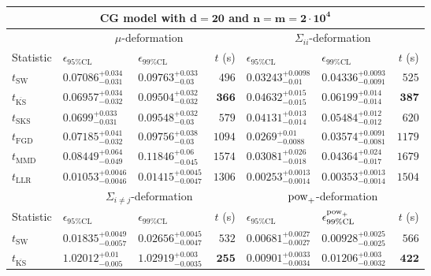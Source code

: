 \begin{tabular}{l|llr|llr}
	\toprule
	\multicolumn{7}{c}{{\bf CG model with $\mathbf{d=20}$ and $\mathbf{n=m=2\cdot 10^{4}}$}} \\
	\toprule
	\multicolumn{1}{c}{} & \multicolumn{3}{c}{$\mu$-deformation} & \multicolumn{3}{c}{$\Sigma_{ii}$-deformation} \\
	Statistic & $\epsilon_{95\%\mathrm{CL}}$ & $\epsilon_{99\%\mathrm    {CL}}$ & $t$ (s) & $\epsilon_{95\%\mathrm{CL}}$ & $\epsilon_{99\%\mathrm{CL}}$ & $t$ (s) \\
	\midrule
	$t_{\mathrm{SW}}$ & $0.07086_{-0.031}^{+0.034}$ & $0.09763_{-0.03}^{+0.033}$ & $496$ & $0.03243_{-0.01}^{+0.0098}$ & $0.04336_{-0.0091}^{+0.0093}$ & $525$ \\
	$t_{\overline{\mathrm{KS}}}$ & ${\mathbf{0.06957_{-0.032}^{+0.034}}}$ & ${\mathbf{0.09504_{-0.032}^{+0.032}}}$ & ${\mathbf{366}}$ & $0.04632_{-0.015}^{+0.015}$ & $0.06199_{-0.014}^{+0.014}$ & ${\mathbf{387}}$ \\
	$t_{\mathrm{SKS}}$ & $0.0699_{-0.031}^{+0.033}$ & $0.09548_{-0.03}^{+0.032}$ & $579$ & $0.04131_{-0.014}^{+0.013}$ & $0.05484_{-0.012}^{+0.012}$ & $620$ \\
	$t_{\mathrm{FGD}}$ & $0.07185_{-0.032}^{+0.041}$ & $0.09756_{-0.03}^{+0.038}$ & $1094$ & ${\mathbf{0.0269_{-0.0088}^{+0.01}}}$ & ${\mathbf{0.03574_{-0.0081}^{+0.0091}}}$ & $1179$ \\
	$t_{\mathrm{MMD}}$ & $0.08449_{-0.049}^{+0.064}$ & $0.11846_{-0.045}^{+0.06}$ & $1574$ & $0.03081_{-0.018}^{+0.026}$ & $0.04364_{-0.017}^{+0.024}$ & $1679$ \\
	$t_{\mathrm{LLR}}$ & $0.01053_{-0.0046}^{+0.0046}$ & $0.01415_{-0.0047}^{+0.0045}$ & $1306$ & $0.00253_{-0.0014}^{+0.0013}$ & $0.00353_{-0.0014}^{+0.0013}$ & $1504$ \\
	\toprule
	\multicolumn{1}{c}{} & \multicolumn{3}{c}{$\Sigma_{i\neq j}$-deformation} & \multicolumn{3}{c}{$\rm{pow}_{+}$-deformation} \\
	Statistic & $\epsilon_{95\%\mathrm{CL}}$ & $\epsilon_{99\%\mathrm{CL}}$ & $t$ (s) & $\epsilon_{95\%\mathrm{CL}}$ & $\epsilon^{\rm   {pow}_{+}}_{99\%\mathrm{CL}}$ & $t$ (s) \\
	\midrule
	$t_{\mathrm{SW}}$ & $0.01835_{-0.0057}^{+0.0049}$ & $0.02656_{-0.0047}^{+0.0045}$ & $532$ & $0.00681_{-0.0027}^{+0.0027}$ & $0.00928_{-0.0025}^{+0.0025}$ & $566$ \\
	$t_{\overline{\mathrm{KS}}}$ & $1.02012_{-0.005}^{+0.01}$ & $1.02919_{-0.0035}^{+0.003}$ & ${\mathbf{255}}$ & $0.00901_{-0.0034}^{+0.0033}$ & $0.01206_{-0.0032}^{+0.003}$ & ${\mathbf{422}}$ \\

\end{tabular}
